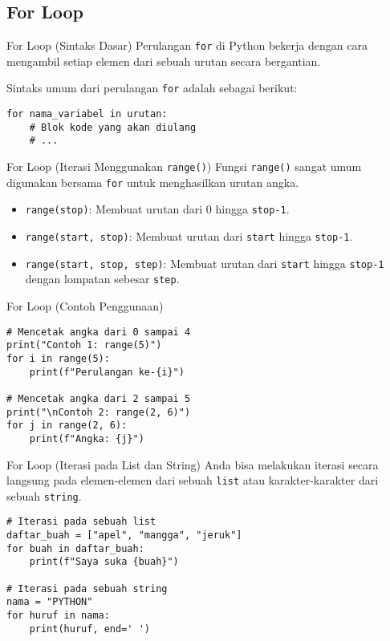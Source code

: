 \documentclass[aspectratio=169, table]{beamer}
\begin{document}
\subsection{For Loop}
\begin{frame}[fragile]{For Loop (Sintaks Dasar)}
Perulangan \texttt{for} di Python bekerja dengan cara mengambil setiap elemen dari sebuah urutan secara bergantian.

Sintaks umum dari perulangan \texttt{for} adalah sebagai berikut:
\begin{lstlisting}[style=PythonStyle, caption={Sintaks Dasar Perulangan for}]
for nama_variabel in urutan:
    # Blok kode yang akan diulang
    # ...
\end{lstlisting}
\end{frame}

\begin{frame}[fragile]{For Loop (Iterasi Menggunakan \texttt{range()})}
Fungsi \texttt{range()} sangat umum digunakan bersama \texttt{for} untuk menghasilkan urutan angka.
\begin{itemize}
    \item \texttt{range(stop)}: Membuat urutan dari 0 hingga \texttt{stop-1}.
    \item \texttt{range(start, stop)}: Membuat urutan dari \texttt{start} hingga \texttt{stop-1}.
    \item \texttt{range(start, stop, step)}: Membuat urutan dari \texttt{start} hingga \texttt{stop-1} dengan lompatan sebesar \texttt{step}.
\end{itemize}
\end{frame}

\begin{frame}[fragile]{For Loop (Contoh Penggunaan)}
\begin{lstlisting}[style=PythonStyle, caption={Kode Python: for_with_range.py}]
# Mencetak angka dari 0 sampai 4
print("Contoh 1: range(5)")
for i in range(5):
    print(f"Perulangan ke-{i}")

# Mencetak angka dari 2 sampai 5
print("\nContoh 2: range(2, 6)")
for j in range(2, 6):
    print(f"Angka: {j}")
\end{lstlisting}
\end{frame}

\begin{frame}[fragile]{For Loop (Iterasi pada List dan String)}
Anda bisa melakukan iterasi secara langsung pada elemen-elemen dari sebuah \texttt{list} atau karakter-karakter dari sebuah \texttt{string}.

\begin{lstlisting}[style=PythonStyle, caption={Kode Python: list_and_string_iteration.py}]
# Iterasi pada sebuah list
daftar_buah = ["apel", "mangga", "jeruk"]
for buah in daftar_buah:
    print(f"Saya suka {buah}")

# Iterasi pada sebuah string
nama = "PYTHON"
for huruf in nama:
    print(huruf, end=' ')
\end{lstlisting}
\end{frame}
\end{document}
